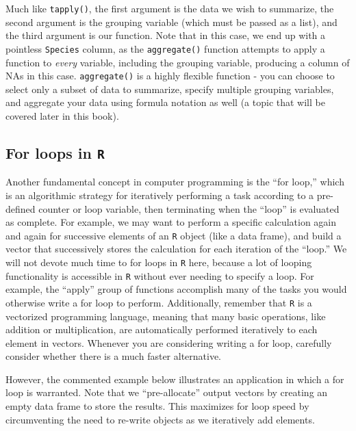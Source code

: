 \documentclass[
]{book}
\begin{document}
Much like \texttt{tapply()}, the first argument is the data we wish to summarize, the second argument is the grouping variable (which must be passed as a list), and the third argument is our function. Note that in this case, we end up with a pointless \texttt{Species} column, as the \texttt{aggregate()} function attempts to apply a function to \emph{every} variable, including the grouping variable, producing a column of NAs in this case. \texttt{aggregate()} is a highly flexible function - you can choose to select only a subset of data to summarize, specify multiple grouping variables, and aggregate your data using formula notation as well (a topic that will be covered later in this book).

\hypertarget{for-loops-in-r}{%
\subsection{\texorpdfstring{For loops in \texttt{R}}{For loops in R}}\label{for-loops-in-r}}

Another fundamental concept in computer programming is the ``for loop,'' which is an algorithmic strategy for iteratively performing a task according to a pre-defined counter or loop variable, then terminating when the ``loop'' is evaluated as complete. For example, we may want to perform a specific calculation again and again for successive elements of an \texttt{R} object (like a data frame), and build a vector that successively stores the calculation for each iteration of the ``loop.'' We will not devote much time to for loops in \texttt{R} here, because a lot of looping functionality is accessible in \texttt{R} without ever needing to specify a loop. For example, the ``apply'' group of functions accomplish many of the tasks you would otherwise write a for loop to perform. Additionally, remember that \texttt{R} is a vectorized programming language, meaning that many basic operations, like addition or multiplication, are automatically performed iteratively to each element in vectors. Whenever you are considering writing a for loop, carefully consider whether there is a much faster alternative.

However, the commented example below illustrates an application in which a for loop is warranted. Note that we ``pre-allocate'' output vectors by creating an empty data frame to store the results. This maximizes for loop speed by circumventing the need to re-write objects as we iteratively add elements.
\end{document}
